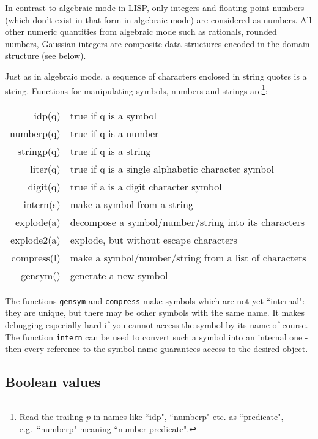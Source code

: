 In contrast to algebraic mode in LISP, only integers and
floating point numbers (which don't exist in that form
in algebraic mode) are considered as numbers. All other
numeric quantities from algebraic mode such as rationals, rounded numbers,
Gaussian integers are composite data structures encoded in
the {\reduce} domain structure (see below).

Just as in algebraic mode, a sequence of characters enclosed
in string quotes is a string. Functions for manipulating symbols, 
numbers  and strings 
are\footnote{Read the trailing $p$ in names like ``idp", ``numberp" etc.
as ``predicate", e.g.\  ``numberp" meaning ``number predicate".}:
\begin{center}
\begin{tabular}{|r|l|} \hline
   idp(q)  & true if q is a symbol \\
   numberp(q) & true if q is a number \\
   stringp(q) & true if q is a string \\
   liter(q)   & true if q is a single alphabetic character symbol\\
   digit(q)   & true if a is a digit character symbol\\
   intern(s)  & make a symbol from a string \\
   explode(a) & decompose a symbol/number/string into its characters \\
   explode2(a)& explode, but without escape characters\\
   compress(l)& make a symbol/number/string from a list of characters \\
   gensym()   & generate a new symbol\\
\hline
\end{tabular}
\end{center}

The functions {\tt gensym}  and {\tt compress} make symbols which are
not yet ``internal": they are unique, but there may be
other symbols with the same name. 
It makes debugging especially hard if you cannot
access the symbol by its name of course. The function {\tt intern}
can be used to convert such a symbol into an internal one -
then every reference to the symbol name guarantees 
access to the desired object.

\subsection{Boolean values}

